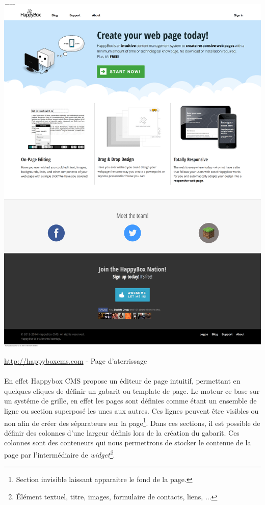 \documentclass[11pt, a4paper ]{article}
\begin{document}
\begin{spacing}{1.5}

\begin{center}
		\includegraphics[width=\textwidth]{images/HBscreen/fullLanding.png}
		\caption{\url{http://happyboxcms.com} - Page d'aterrissage}
\end{center}

\paragraph{}
En effet Happybox CMS propose un éditeur de page intuitif, permettant en quelques cliques de définir un gabarit ou template de page. Le moteur ce base sur un systéme de grille, en effet les pages sont définies comme étant un ensemble de ligne ou section superposé les unes aux autres. Ces lignes peuvent être visibles ou non afin de créer des séparateurs sur la page\footnote{Section invisible laissant apparaitre le fond de la page.}. Dans ces sections, il est possible de définir des colonnes d'une largeur définis lors de la création du gabarit. Ces colonnes sont des conteneurs qui nous permettrons de stocker le contenue de la page par l'intermédiaire de \emph{widget\footnote{Élément textuel, titre, images, formulaire de contacts, liens, ...}}.


\end{spacing}
\end{document}
